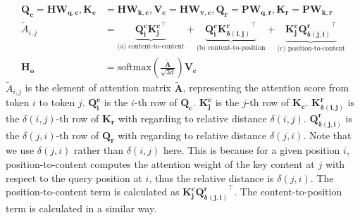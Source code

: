 \begin{equation} \label{dis-att}
\begin{split}
    \bm{Q_c} = \bm{H} \bm{W_{q,c}}, 
    \bm{K_c} &= \bm{H} \bm{W_{k,c}}, 
    \bm{V_c} = \bm{H} \bm{W_{v,c}}, 
    \bm{Q_r} = \bm{P} \bm{W_{q,r}}, 
    \bm{K_r} = \bm{P} \bm{W_{k,r}}\\
    \tilde{A}_{i,j} &= \underbrace{\bm{Q^{c}_{i}}\bm{{K^{c}_{j}}^{\intercal}}}_{\text{(a) content-to-content}}  
    + \underbrace{\bm{Q^{c}_{i}}\bm{{K^{r}_{\delta(i,j)}}^{\intercal}}}_{\text{(b) content-to-position}}
    + \underbrace{\bm{K^{c}_{j}}\bm{{Q^{r}_{\delta(j,i)}}^{\intercal}}}_{\text{(c) position-to-content}} \\
    \bm{H_o} &= \text{softmax}(\frac{\bm{\tilde{A}}}{\sqrt{3d}})\bm{V_c}
\end{split}
\end{equation}
$\tilde{A}_{i,j}$ is the element of attention matrix $\bm{\tilde{A}}$, representing the attention score from token $i$ to token $j$. 
$\bm{Q^{c}_{i}}$ is the $i$-th row of $\bm{Q_c}$. %
$\bm{K^{c}_{j}}$ is the $j$-th row of $\bm{K_c}$. 
$\bm{K^{r}_{\delta(i,j)}}$ is the $\delta(i,j)$-th row of $\bm{K_r}$ with regarding to relative distance $\delta(i,j)$.
$\bm{Q^{r}_{\delta(j,i)}}$ is the $\delta(j,i)$-th row of $\bm{Q_r}$ with regarding to relative distance $\delta(j,i)$. 
Note that we use $\delta(j,i)$ rather than $\delta(i,j)$ here. This is because for a given position $i$, position-to-content computes the attention weight of the key content at $j$ with respect to the query position at $i$, thus the relative distance is $\delta(j,i)$. 
The position-to-content term is calculated as $\bm{K^{c}_{j}}\bm{{Q^{r}_{\delta(j,i)}}^{\intercal}}$.
The content-to-position term is calculated in a similar way.

